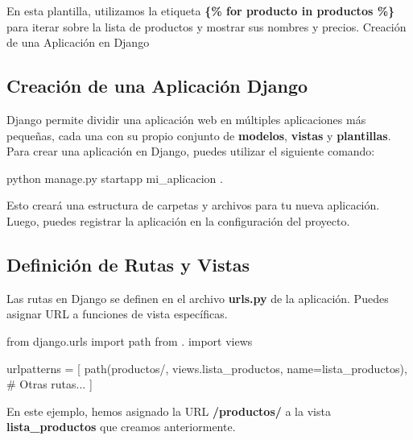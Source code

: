 \documentclass[
  a4paper,
  DIV=11,
  numbers=noendperiod,
  onepage,
  openany]{scrreprt}
\newenvironment{Shaded}{\begin{snugshade}}{\end{snugshade}}
\newcommand{\CommentTok}[1]{\textcolor[rgb]{0.37,0.37,0.37}{#1}}
\newcommand{\ExtensionTok}[1]{\textcolor[rgb]{0.00,0.23,0.31}{#1}}
\newcommand{\ImportTok}[1]{\textcolor[rgb]{0.00,0.46,0.62}{#1}}
\newcommand{\NormalTok}[1]{\textcolor[rgb]{0.00,0.23,0.31}{#1}}
\newcommand{\OperatorTok}[1]{\textcolor[rgb]{0.37,0.37,0.37}{#1}}
\newcommand{\StringTok}[1]{\textcolor[rgb]{0.13,0.47,0.30}{#1}}
\begin{document}
En esta plantilla, utilizamos la etiqueta \textbf{\{\% for producto in
productos \%\}} para iterar sobre la lista de productos y mostrar sus
nombres y precios. Creación de una Aplicación en Django

\subsection{Creación de una Aplicación
Django}\label{creaciuxf3n-de-una-aplicaciuxf3n-django}

Django permite dividir una aplicación web en múltiples aplicaciones más
pequeñas, cada una con su propio conjunto de \textbf{modelos},
\textbf{vistas} y \textbf{plantillas}. Para crear una aplicación en
Django, puedes utilizar el siguiente comando:

\begin{Shaded}
\begin{Highlighting}[]
\ExtensionTok{python}\NormalTok{ manage.py startapp mi\_aplicacion .}
\end{Highlighting}
\end{Shaded}

Esto creará una estructura de carpetas y archivos para tu nueva
aplicación. Luego, puedes registrar la aplicación en la configuración
del proyecto.

\subsection{Definición de Rutas y
Vistas}\label{definiciuxf3n-de-rutas-y-vistas}

Las rutas en Django se definen en el archivo \textbf{urls.py} de la
aplicación. Puedes asignar URL a funciones de vista específicas.

\begin{Shaded}
\begin{Highlighting}[]
\ImportTok{from}\NormalTok{ django.urls }\ImportTok{import}\NormalTok{ path}
\ImportTok{from}\NormalTok{ . }\ImportTok{import}\NormalTok{ views}

\NormalTok{urlpatterns }\OperatorTok{=}\NormalTok{ [}
\NormalTok{    path(}\StringTok{\textquotesingle{}productos/\textquotesingle{}}\NormalTok{, views.lista\_productos, name}\OperatorTok{=}\StringTok{\textquotesingle{}lista\_productos\textquotesingle{}}\NormalTok{),}
    \CommentTok{\# Otras rutas...}
\NormalTok{]}
\end{Highlighting}
\end{Shaded}

En este ejemplo, hemos asignado la URL \textbf{/productos/} a la vista
\textbf{lista\_productos} que creamos anteriormente.
\end{document}

